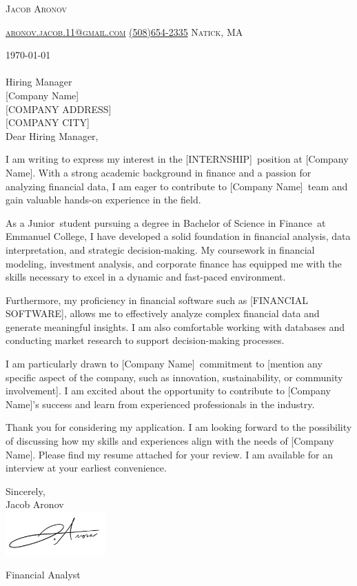 \documentclass[11pt]{letter}
\makeatletter
\def\myname{Jacob Aronov}
\def\myemail{aronov.jacob.11@gmail.com}
\def\myphone{(508)654-2335}
\def\mylocation{Natick, MA}
\def\mytitle{Financial Analyst}
\def\myyear{Junior}
\def\mydegree{Bachelor of Science in Finance}
\def\myuniversity{Emmanuel College}
\def\possitionApplied{[INTERNSHIP]}
\def\hiringManager{Hiring Manager}
\def\companyName{[Company Name]}
\def\companyAddress{[COMPANY ADDRESS]}
\def\companyCity{[COMPANY CITY]}
\def\softwareUsed{[FINANCIAL SOFTWARE]}
\def\companyMission{[mention any specific aspect of the company, such as innovation, sustainability, or community involvement]}
\newcommand{\addressHeading}[4]{
    {#1}\\
    {#2}\\
    {#3}\\
    {#4}\\
}
\newcommand{\greeting}{
    \vspace{-0.1in}Dear \hiringManager,
}
\makeatother
\begin{document}
\AddToShipoutPictureBG{%
\color{gr}
\AtPageUpperLeft{\rule[-1.3in]{\paperwidth}{1.3in}}
}

\begin{center}
{\fontsize{28}{0}\selectfont\scshape \myname}

\fontsize{10}{0}\selectfont\scshape \href{mailto:\myemail}{\faEnvelope\enspace \myemail}\hfill
\fontsize{10}{0}\selectfont\scshape \href{tel:\myphone}{\faPhone\enspace \myphone}\hfill
\fontsize{10}{0}\selectfont\scshape \faMapMarker\enspace \mylocation
\end{center}

\vspace{0.2in}

\today
\\ \\
\addressHeading{\hiringManager}{\companyName}{\companyAddress}{\companyCity}

\greeting

I am writing to express my interest in the \possitionApplied\, position at \companyName. 
With a strong academic background in finance and a passion for analyzing financial data, 
I am eager to contribute to \companyName\, team and gain valuable hands-on experience in the field.

As a \myyear\, student pursuing a degree in \mydegree\, at \myuniversity, I have developed 
a solid foundation in financial analysis, data interpretation, and strategic decision-making. 
My coursework in financial modeling, investment analysis, and corporate finance has equipped me 
with the skills necessary to excel in a dynamic and fast-paced environment.

Furthermore, my proficiency in financial software such as \softwareUsed,  
allows me to effectively analyze complex financial data and generate meaningful insights. 
I am also comfortable working with databases and conducting market research to support 
decision-making processes.

I am particularly drawn to \companyName\, commitment to \companyMission. 
I am excited about the opportunity to contribute to [Company Name]'s success and learn from 
experienced professionals in the industry.

Thank you for considering my application. I am looking forward to the possibility of discussing 
how my skills and experiences align with the needs of \companyName. Please find my resume attached 
for your review. I am available for an interview at your earliest convenience.

\vspace{0.1in}
\vfill

\begin{flushright}

\vspace{-0.1in}
Sincerely, \\
\myname\\

\includegraphics[width=1.5in]{signature_transparent.png}

\vspace{-0.1in}
\mytitle

\end{flushright}
\end{document}
